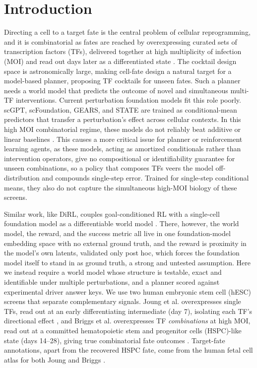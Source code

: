 \documentclass{article}
\begin{document}
\section{Introduction}
Directing a cell to a target fate is the central problem of cellular reprogramming, and it is
combinatorial as fates are reached by overexpressing curated sets of transcription factors (TFs),
delivered together at high multiplicity of infection (MOI) and read out days later as a
differentiated state \citep{joung2023tfatlas,briggs2026}. The cocktail design space is
astronomically large, making cell-fate design a natural target for a model-based planner, proposing TF cocktails for unseen fates. Such a planner needs a world model that predicts the
outcome of novel and simultaneous multi-TF interventions. Current perturbation foundation models fit this role poorly. scGPT, scFoundation, GEARS, and STATE
\citep{cui2024scgpt,hao2024scfoundation,roohani2024gears,adduri2025state} are trained as
conditional-mean predictors that transfer a perturbation's effect across cellular contexts.
In this high MOI combinatorial regime, these models do not reliably beat additive or linear
baselines \citep{ahlmanneltze2025,perturbench2024}. This causes a more critical issue for planner or reinforcement learning agents, as these models, acting as amortized conditionals rather than intervention operators, give no compositional or identifiability guarantee for unseen combinations, so a
policy that composes TFs veers the model off-distribution and compounds single-step error. Trained for
single-step conditional means, they also do not capture the simultaneous high-MOI biology of these screens.

Similar work, like DiRL, couples goal-conditioned RL with a single-cell foundation model as a differentiable
world model \citep{dirl2025}. There, however, the world model, the reward, and the success metric
all live in one foundation-model embedding space with no external ground truth, and the reward
is proximity in the model's own latents, validated only post hoc, which forces the foundation model itself to
stand in as ground truth, a strong and untested assumption. Here we instead require a world model whose
structure is testable, exact and identifiable under multiple perturbations, and a planner scored against
experimental driver answer keys. We use two human embryonic stem cell (hESC) screens that separate complementary signals. Joung et al. overexpresses single TFs, read
out at an early differentiating intermediate (day 7), isolating each TF's directional effect
\citep{joung2023tfatlas}, and Briggs et al. overexpresses TF \emph{combinations} at high MOI, read out at a
committed hematopoietic stem and progenitor cells (HSPC)-like state (days 14--28), giving true combinatorial fate outcomes
\citep{briggs2026}. Target-fate annotations, apart from the recovered HSPC fate, come from the human fetal cell atlas for both Joung and Briggs \citep{cao2020fetal}.
\end{document}
